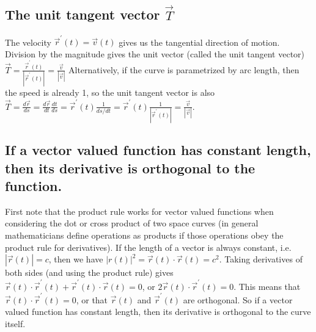  

\subsection{The unit tangent vector $\vec T$}
The velocity {$\vec r^\prime(t) = \vec v(t)$} gives us the tangential
direction of motion. Division by the magnitude gives the unit vector
(called the unit tangent vector) {$ \vec T  = \frac{\vec r^\prime(t)}{|\vec
r^\prime(t)|} = \frac{\vec v}{|\vec v|}$}
Alternatively, if the curve is parametrized by arc length, then the
speed is already 1, so the unit tangent vector is also $ \vec T  =
\frac{d\vec r}{ds}  =  \frac{d\vec r}{dt} \frac{dt}{ds} = \vec r^\prime(t)
\frac{1}{ds/dt}  = \vec r^\prime(t) \frac{1}{|\vec r^\prime(t)|}= \frac{\vec
v}{|\vec v|}$.

\subsection{If a vector valued function has constant length, then its
derivative is orthogonal to the function.}
First note that the product rule works for vector valued functions
when considering the dot or cross product of two space curves (in
general mathematicians define operations as products if those
operations obey the product rule for derivatives). If the length of a
vector is always constant, i.e. {$ |\vec r(t)|=c $}, then we have {$
  |r(t)|^2 = \vec r(t)\cdot \vec r(t) = c^2 $}.  Taking derivatives of
both sides (and using the product rule) gives {$ \vec r(t)\cdot \vec
  r^\prime(t)+\vec r^\prime(t)\cdot \vec r(t)=0 $}, or {$2\vec r(t)\cdot \vec r^\prime(t)=0
  $}.  This means that {$ \vec r(t)\cdot \vec r^\prime(t)=0 $}, or that {$ \vec
  r(t) $} and {$ \vec r^\prime(t) $} are orthogonal. So if a vector valued
function has constant length, then its derivative is orthogonal to the
curve itself.


